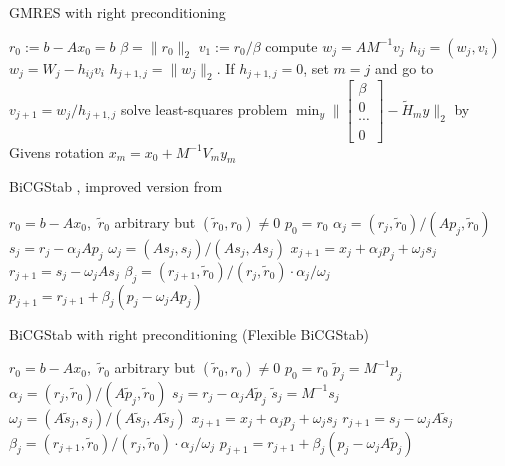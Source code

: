 \documentclass[10pt]{article}
\begin{document}
\begin{algorithm}[H]
  \caption{GMRES with right preconditioning \citep[algorithm 9.5]{Saad_2003_IMS}}\label{alg:CG}
  \begin{algorithmic}[1]
    \State $r_0:=b-A x_0=b$
    \State $\beta=\|r_0\|_2$
    \State $v_1:=r_0/\beta$
    \State compute $w_j=AM^{-1}v_j$
        \State $h_{ij}=(w_j,v_i)$
        \State $w_j=W_j-h_{ij} v_i$
        \EndFor
    \State $h_{j+1,j}=\|w_j\|_2$. If $h_{j+1,j}=0$, set $m=j$ and go to
    \State $v_{j+1} = w_j/h_{j+1,j}$
    \State solve least-squares problem $\min_y\|\begin{bmatrix}
    \beta\\
    0\\
    \cdots\\
    0
    \end{bmatrix}- \tilde{H}_m y\|_2$ by Givens rotation
    \State $x_m = x_0+M^{-1}V_m y_m$
    \EndFor
  \end{algorithmic}
\end{algorithm}

\begin{algorithm}[H]
  \caption{BiCGStab \citep{chen2016analysis}, improved version from \citep{van1992bicgstab}}\label{alg:CG}
  \begin{algorithmic}[1]
    \State $r_0=b-Ax_0,$ $\tilde{r}_0$ arbitrary but $(\tilde{r}_0,r_0)\neq 0$
    \State $p_0 = r_0$
    \State $\alpha_j = (r_j , \tilde{r}_0 )/(Ap_j , \tilde{r}_0 )$
    \State $s_j=r_j-\alpha_j Ap_j$ 
    \State $\omega_j = (As_j , s_j )/(As_j , As_j ) $
    \State $x_{j+1} = x_j + \alpha_j  p_j + \omega_j s_j$
    \State $r_{j+1}=s_j-\omega_j As_j$
    \State $\beta_j = (r_{j+1},\tilde{r}_0 )/(r_j,\tilde{r}_0 )\cdot \alpha_j/\omega_j$
    \State $p_{j+1}=r_{j+1}+\beta_j(p_j-\omega_j Ap_j)$
    \EndFor
  \end{algorithmic}
\end{algorithm}


\begin{algorithm}[H]
  \caption{BiCGStab with right preconditioning (Flexible BiCGStab) \citep{chen2016analysis}}\label{alg:CG}
  \begin{algorithmic}[1]
    \State $r_0=b-Ax_0,$ $\tilde{r}_0$ arbitrary but $(\tilde{r}_0,r_0)\neq 0$
    \State $p_0 = r_0$
    \State $\tilde{p}_j=M^{-1}p_j$
    \State $\alpha_j = (r_j , \tilde{r}_0 )/(A\tilde{p}_j, \tilde{r}_0 )$
    \State $s_j=r_j-\alpha_j A\tilde{p}_j$
    \State $\tilde{s}_j=M^{-1}s_j$
    \State $\omega_j = (A\tilde{s}_j , s_j )/(A\tilde{s}_j,A\tilde{s}_j ) $
    \State $x_{j+1} = x_j + \alpha_j  p_j + \omega_j s_j$
    \State $r_{j+1}=s_j-\omega_j A\tilde{s}_j$
    \State $\beta_j = (r_{j+1},\tilde{r}_0 )/(r_j,\tilde{r}_0 )\cdot \alpha_j/\omega_j$
    \State $p_{j+1}=r_{j+1}+\beta_j(p_j-\omega_j A\tilde{p}_j)$
    \EndFor
  \end{algorithmic}
\end{algorithm}
\end{document}

